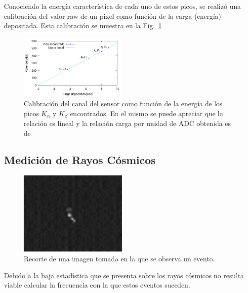 \documentclass[twoside,twocolumn]{article}
\begin{document}
    Conociendo la energía característica de cada uno de estos picos, %
    se realizó una calibración del valor raw de un pixel como función de la carga (energía) depositada.
    Esta calibración se muestra en la Fig.~\ref{fig:x-ray_calibration}

    \begin{figure}[h]
      \includegraphics[width=0.47\textwidth]{figures/x-ray_calibration} %
      \caption{Calibración del canal del sensor como función de la energía de los picos $K_{\alpha}$ y $K_{\beta}$ encontrados.
        En el mismo se puede apreciar que la relación es lineal y la relación carga por unidad de ADC obtenida es de $ $ %
      }
      \label{fig:x-ray_calibration}
    \end{figure}

    \subsection{Medición de Rayos Cósmicos}\label{sec:results:cosmic_ray}


    \begin{figure}[h]
      \includegraphics[width=0.47\textwidth]{figures/06-04-18_09-27-42.pdf} %
      \caption{Recorte de una imagen tomada en la que se observa un evento.}
      \label{fig:cosmic_ray}
    \end{figure}

    Debido a la baja estadística que se presenta sobre los rayos cósmicos no resulta viable calcular la frecuencia
    con la que estos eventos suceden.
\end{document}

